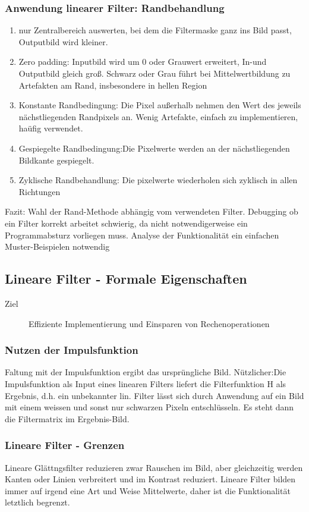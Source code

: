 \documentclass[11pt]{article}
\begin{document}
\subsubsection{Anwendung linearer Filter: Randbehandlung}
\label{sec:org334f3b1}
\begin{enumerate}
\item nur Zentralbereich auswerten, bei dem die Filtermaske ganz ins Bild passt, Outputbild wird kleiner.
\item Zero padding: Inputbild wird um 0 oder Grauwert erweitert, In-und Outputbild gleich groß. Schwarz oder Grau führt bei Mittelwertbildung zu Artefakten am Rand, insbesondere in hellen Region
\item Konstante Randbedingung: Die Pixel außerhalb nehmen den Wert des jeweils nächstliegenden Randpixels an. Wenig Artefakte, einfach zu implementieren, haüfig verwendet.
\item Gespiegelte Randbedingung:Die Pixelwerte werden an der nächstliegenden Bildkante gespiegelt.
\item Zyklische Randbehandlung: Die pixelwerte wiederholen sich zyklisch in allen Richtungen
\end{enumerate}
Fazit: Wahl der Rand-Methode abhängig vom verwendeten Filter. Debugging ob ein Filter korrekt arbeitet schwierig, da nicht notwendigerweise ein Programmabsturz vorliegen muss. Analyse der Funktionalität ein einfachen Muster-Beispielen notwendig
\subsection{Lineare Filter - Formale Eigenschaften}
\label{sec:org6490738}
\begin{description}
\item[{Ziel}] Effiziente Implementierung und Einsparen von Rechenoperationen
\end{description}
\subsubsection{Nutzen der Impulsfunktion}
\label{sec:org9ee435a}
Faltung mit der Impulsfunktion ergibt das ursprüngliche Bild.
Nützlicher:Die Impulsfunktion als Input eines linearen Filters liefert die Filterfunktion H als Ergebnis, d.h. ein unbekannter lin. Filter lässt sich durch Anwendung auf ein Bild mit einem weissen und sonst nur schwarzen Pixeln entschlüsseln. Es steht dann die Filtermatrix im Ergebnis-Bild.
\subsubsection{Lineare Filter - Grenzen}
\label{sec:orgf9faa3a}
Lineare Glättngsfilter reduzieren zwar Rauschen im Bild, aber gleichzeitig werden Kanten oder Linien verbreitert und im Kontrast reduziert. Lineare Filter bilden immer auf irgend eine Art und Weise Mittelwerte, daher ist die Funktionalität letztlich begrenzt.
\end{document}
